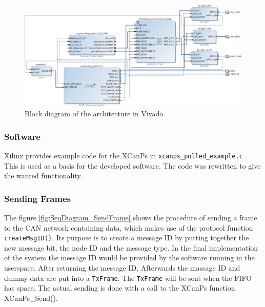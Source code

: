 \begin{figure}[h!]
	\centering
	\includegraphics[width = 1\linewidth]{graphics/Zybo_BasicTestingArchitecture_for_CAN.png}
	\caption{Block diagram of the architecture in Vivado.}
	\label{fig:CAN_Testing_Architecture}
\end{figure}

\subsubsection*{Software}\label{sub:Basic_SourceCode}
Xilinx provides example code for the XCanPs in \texttt{xcanps\_polled\_example.c} \cite{xcanps}.
This is used as a basis for the developed software.
The code was rewritten to give the wanted functionality.

\subsubsection*{Sending Frames}
The figure \ref{fig:SeqDiagram_SendFrame} shows the procedure of sending a frame to the CAN network containing data, which makes use of the protocol function \texttt{createMsgID()}.
Its purpose is to create a message ID by putting together the new message bit, the node ID and the message type.
In the final implementation of the system the message ID would be provided by the software running in the userspace.
After returning the message ID, 
Afterwards the massage ID and dummy data are put into a \texttt{TxFrame}.
The \texttt{TxFrame} will be sent when the FIFO has space.
The actual sending is done with a call to the XCanPs function XCanPs\_Send().


